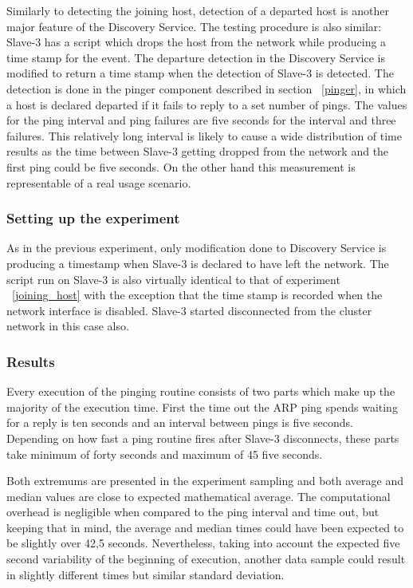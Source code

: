 Similarly to detecting the joining host, detection of a departed host is another major feature of the Discovery Service. The testing procedure is also similar: Slave-3 has a script which drops the host from the network while producing a time stamp for the event. The departure detection in the Discovery Service is modified to return a time stamp when the detection of Slave-3 is detected. The detection is done in the pinger component described in section ~\ref{pinger}, in which a host is declared departed if it fails to reply to a set number of pings. The values for the ping interval and ping failures are five seconds for the interval and three failures. This relatively long interval is likely to cause a wide distribution of time results as the time between Slave-3 getting dropped from the network and the first ping could be five seconds. On the other hand this measurement is representable of a real usage scenario. \newline 

\subsubsection*{Setting up the experiment}

As in the previous experiment, only modification done to Discovery Service is producing a timestamp when Slave-3 is declared to have left the network. The script run on Slave-3 is also virtually identical to that of experiment ~\ref{joining_host} with the exception that the time stamp is recorded when the network interface is disabled. Slave-3 started disconnected from the cluster network in this case also.

\subsubsection*{Results}

Every execution of the pinging routine consists of two parts which make up the majority of the execution time. First the time out the ARP ping spends waiting for a reply is ten seconds and an interval between pings is five seconds. Depending on how fast a ping routine fires after Slave-3 disconnects, these parts take minimum of forty seconds and maximum of 45 five seconds.

Both extremums are presented in the experiment sampling and both average and median values are close to expected mathematical average. The computational overhead is negligible when compared to the ping interval and time out, but keeping that in mind, the average and median times could have been expected to be slightly over 42,5 seconds. 
Nevertheless, taking into account the expected five second variability of the beginning of execution, another data sample could result in slightly different times but similar standard deviation.

